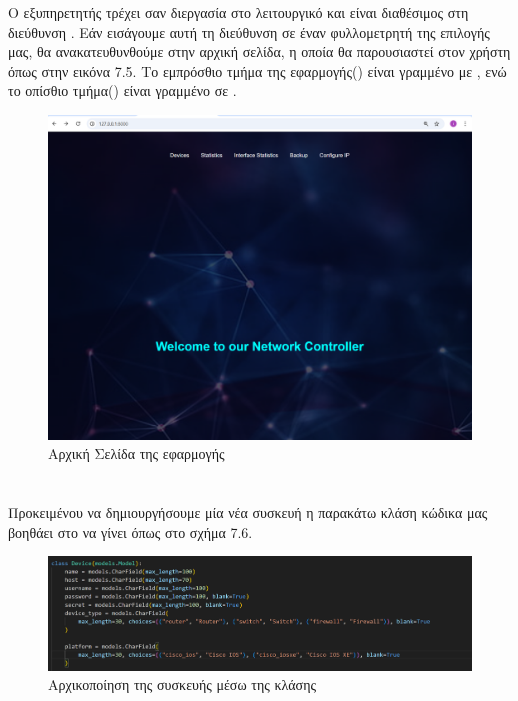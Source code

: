 \FloatBarrier



Ο εξυπηρετητής τρέχει σαν διεργασία στο λειτουργικό
και είναι διαθέσιμος στη διεύθυνση . Εάν εισάγουμε αυτή τη διεύθυνση σε έναν 
φυλλομετρητή της επιλογής μας, θα ανακατευθυνθούμε 
στην αρχική σελίδα, η οποία θα παρουσιαστεί στον 
χρήστη όπως στην εικόνα 7.5. Το εμπρόσθιο τμήμα της εφαρμογής() 
είναι γραμμένο με , ενώ το οπίσθιο τμήμα() 
είναι γραμμένο σε .

\FloatBarrier
\begin{figure}[h]
	\centering
	\includegraphics[width=1.2\textwidth]{graphics/home_page.png}
	\caption{ Αρχική Σελίδα της εφαρμογής}
\end{figure}

\FloatBarrier %

\section{}

Προκειμένου να δημιουργήσουμε μία νέα συσκευή η παρακάτω κλάση
κώδικα μας βοηθάει στο να γίνει όπως στο σχήμα 7.6.

\FloatBarrier
\begin{figure}[htb]
	\centering
	\includegraphics[width=1.2\textwidth]{graphics/class_device.png}
	\caption{Αρχικοποίηση της συσκευής μέσω της κλάσης }
\end{figure}


